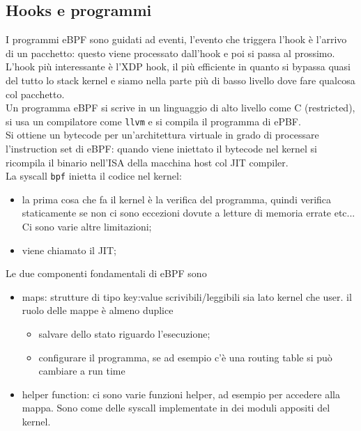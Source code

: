 \documentclass[12pt, oneside]{extbook} %
\begin{document}
\subsection{Hooks e programmi}
I programmi eBPF sono guidati ad eventi, l'evento che triggera l'hook è l'arrivo di un pacchetto: questo viene processato dall'hook e poi si passa al prossimo.
\\L'hook più interessante è l'XDP hook, il più efficiente in quanto si bypassa quasi del tutto lo stack kernel e siamo nella parte più di basso livello dove fare qualcosa col pacchetto.
\\Un programma eBPF si scrive in un linguaggio di alto livello come C (restricted), si usa un compilatore come \texttt{llvm} e si compila il programma di ePBF.
\\Si ottiene un bytecode per un'architettura virtuale in grado di processare l'instruction set di eBPF: quando viene iniettato il bytecode nel kernel si ricompila il binario nell'ISA della macchina host col JIT compiler.
\\La syscall \texttt{bpf} inietta il codice nel kernel:
\begin{itemize}
\item la prima cosa che fa il kernel è la verifica del programma, quindi verifica staticamente se non ci sono eccezioni dovute a letture di memoria errate etc... Ci sono varie altre limitazioni; 
\item viene chiamato il JIT;
\end{itemize}
Le due componenti fondamentali di eBPF sono
\begin{itemize}
\item maps: strutture di tipo key:value scrivibili/leggibili sia lato kernel che user. il ruolo delle mappe è almeno duplice
\begin{itemize}
\item salvare dello stato riguardo l'esecuzione;
\item configurare il programma, se ad esempio c'è una routing table si può cambiare a run time
\end{itemize}
\item helper function: ci sono varie funzioni helper, ad esempio per accedere alla mappa. Sono come delle syscall implementate in dei moduli appositi del kernel.
\end{itemize}
\end{document}
